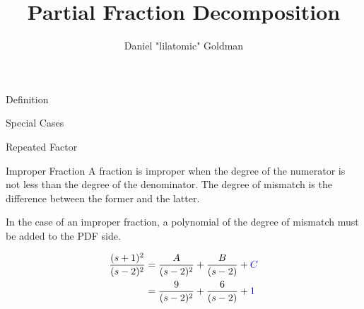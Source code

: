 \documentclass{../templates/topic}
\title{Partial Fraction Decomposition}
\author{Daniel "lilatomic" Goldman}
\begin{document}
\maketitle

\begin{section}{Definition}
\end{section}

\begin{section}{Special Cases}
	\begin{subsection}{Repeated Factor}
	\end{subsection}
	\begin{subsection}{Improper Fraction}
		A fraction is improper when the degree of the numerator is not less than the degree of the denominator. The degree of mismatch is the difference between the former and the latter.
		
		In the case of an improper fraction, a polynomial of the degree of mismatch must be added to the PDF side.
		
		\begin{align*}
			\frac{(s+1)^2}{(s-2)^2} &= \frac{A}{(s-2)^2}+\frac{B}{(s-2)}+\textcolor{blue}{C} \\
			&= \frac{9}{(s-2)^2}+\frac{6}{(s-2)}+\textcolor{blue}{1}
		\end{align*}
		
		
	\end{subsection}
\end{section}
	
\end{document}
